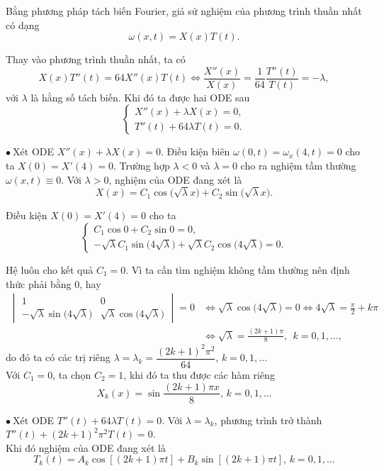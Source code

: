 \documentclass[10pt, a4paper]{article}
\begin{document}
	Bằng phương pháp tách biến Fourier, giả sử nghiệm của phương trình thuần nhất có dạng $$\omega(x,t)=X(x)T(t).$$
	
	Thay vào phương trình thuần nhất, ta có $$X(x)T''(t)=64X''(x)T(t)\iff\frac{X''(x)}{X(x)}=\frac{1}{64}\frac{T''(t)}{T(t)}=-\lambda,$$
	với $\lambda$ là hằng số tách biến. Khi đó ta được hai ODE sau $$\begin{cases}
		X''(x)+\lambda X(x)=0,\\
		T''(t)+64\lambda T(t)=0.
	\end{cases}$$
	
	$\bullet~$Xét ODE $X''(x)+\lambda X(x)=0$. Điều kiện biên $\omega(0,t)=\omega_x(4,t)=0$ cho ta $X(0)=X'(4)=0$. Trường hợp $\lambda<0$ và $\lambda=0$ cho ra nghiệm tầm thường $\omega(x,t)\equiv0$. Với $\lambda>0$, nghiệm của ODE đang xét là $$X(x)=C_1\cos\big(\sqrt\lambda x\big)+C_2\sin\big(\sqrt\lambda x\big).$$
	
	Điều kiện $X(0)=X'(4)=0$ cho ta $$\begin{cases}
		C_1\cos0+C_2\sin0=0,\\
		-\sqrt\lambda C_1\sin\big(4\sqrt\lambda\big)+\sqrt\lambda C_2\cos\big(4\sqrt\lambda\big)=0.
	\end{cases}$$
	
	Hệ luôn cho kết quả $C_1=0$. Vì ta cần tìm nghiệm không tầm thường nên định thức phải bằng 0, hay \begin{align*}
		\begin{vmatrix}
			1&0\\
			-\sqrt\lambda\sin\big(4\sqrt\lambda\big)&\sqrt\lambda\cos\big(4\sqrt\lambda\big)
		\end{vmatrix}=0&\iff\sqrt\lambda\cos\big(4\sqrt\lambda\big)=0\iff4\sqrt\lambda=\frac\pi2+k\pi\\
		&\iff\sqrt\lambda=\frac{(2k+1)\pi}{8},~~k=0,1,\ldots,
	\end{align*}
	do đó ta có các trị riêng $\lambda=\lambda_k=\dfrac{(2k+1)^2\pi^2}{64},\,k=0,1,\ldots$\\
	
	Với $C_1=0$, ta chọn $C_2=1$, khi đó ta thu được các hàm riêng $$X_k(x)=\sin\frac{(2k+1)\pi x}{8},\,k=0,1,\ldots$$
	
	$\bullet~$Xét ODE $T''(t)+64\lambda T(t)=0$. Với $\lambda=\lambda_k$, phương trình trở thành $T''(t)+(2k+1)^2\pi^2T(t)=0$.\\
	
	Khi đó nghiệm của ODE đang xét là $$T_k(t)=A_k\cos[(2k+1)\pi t]+B_k\sin[(2k+1)\pi t],\,k=0,1,\ldots$$
	
\end{document}
